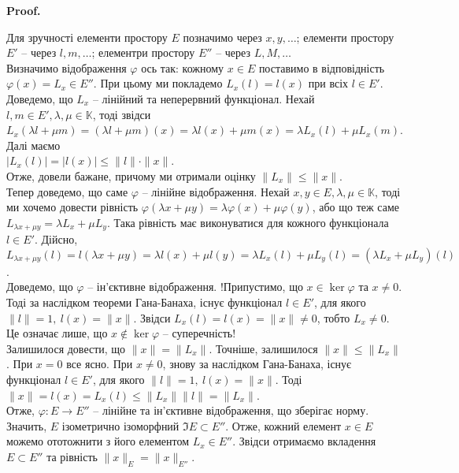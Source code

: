 \documentclass[a4paper, 10pt]{article}
\makeatletter
\theoremstyle{theoremdd}
\theoremstyle{theoremdd}
\theoremstyle{theoremdd}
\theoremstyle{theoremdd}
\theoremstyle{theoremdd}
\theoremstyle{theoremdd}
\theoremstyle{theoremdd}
\theoremstyle{theoremdd}
\renewenvironment{proof}[1][Proof.\\]{\par
\pushQED{\hfill \qed}%
\normalfont \topsep6\p@\@plus6\p@\relax
\trivlist
\item\relax
{\bfseries
#1\@addpunct{.}}\hspace\labelsep\ignorespaces
}{%
\popQED\endtrivlist\@endpefalse
}
\makeatother
\begin{document}
\begin{proof}
Для зручності елементи простору $E$ позначимо через $x,y,\dots$; елементи простору $E'$ -- через $l,m,\dots$; елементри простору $E''$ -- через $L,M,\dots$\\
Визначимо відображення $\varphi$ ось так: кожному $x \in E$ поставимо в відповідність $\varphi(x) = L_x \in E''$. При цьому ми покладемо $L_x(l) = l(x)$ при всіх $l \in E'$. \\
Доведемо, що $L_x$ -- лінійний та неперервний функціонал. Нехай $l,m \in E', \lambda,\mu \in \mathbb{K}$, тоді звідси $L_x(\lambda l + \mu m) = (\lambda l + \mu m)(x) = \lambda l(x) + \mu m(x) = \lambda L_x(l) + \mu L_x(m)$. Далі маємо\\
$|L_x(l)| = |l(x)| \leq \|l\| \cdot \|x\|$.\\
Отже, довели бажане, причому ми отримали оцінку $\|L_x\| \leq \|x\|$.\\
Тепер доведемо, що саме $\varphi$ -- лінійне відображення. Нехай $x,y \in E, \lambda, \mu \in \mathbb{K}$, тоді ми хочемо довести рівність $\varphi(\lambda x + \mu y) = \lambda \varphi(x) + \mu \varphi(y)$, або що теж саме $L_{\lambda x + \mu y} = \lambda L_x + \mu L_y$. Така рівність має виконуватися для кожного функціонала $l \in E'$. Дійсно,\\
$L_{\lambda x + \mu y}(l) = l(\lambda x + \mu y) = \lambda l(x) + \mu l(y) = \lambda L_x(l) + \mu L_y(l) = (\lambda L_x + \mu L_y)(l)$.\\
Доведемо, що $\varphi$ -- ін'єктивне відображення. !Припустимо, що $x \in \ker \varphi$ та $x \neq 0$. Тоді за наслідком теореми Гана-Банаха, існує функціонал $l \in E'$, для якого $\|l\| = 1,\ l(x) = \|x\|$. Звідси $L_x(l) = l(x) = \|x\| \neq 0$, тобто $L_x \neq 0$. Це означає лише, що $x \notin \ker \varphi$ -- суперечність!\\
Залишилося довести, що $\|x\| = \|L_x\|$. Точніше, залишилося $\|x\| \leq \|L_x\|$. При $x = 0$ все ясно. При $x \neq 0$, знову за наслідком Гана-Банаха, існує функціонал $l \in E'$, для якого $\|l\| = 1,\ l(x) = \|x\|$. Тоді\\
$\|x\| = l(x) = L_x(l) \leq \|L_x\| \|l\| = \|L_x\|$.\\
Отже, $\varphi \colon E \to E''$ -- лінійне та ін'єктивне відображення, що зберігає норму. Значить, $E$ ізометрично ізоморфний $\Im E \subset E''$. Отже, кожний елемент $x \in E$ можемо ототожнити з його елементом $L_x \in E''$. Звідси отримаємо вкладення $E \subset E''$ та рівність $\|x\|_E = \|x\|_{E''}$.
\end{proof}
\end{document}
